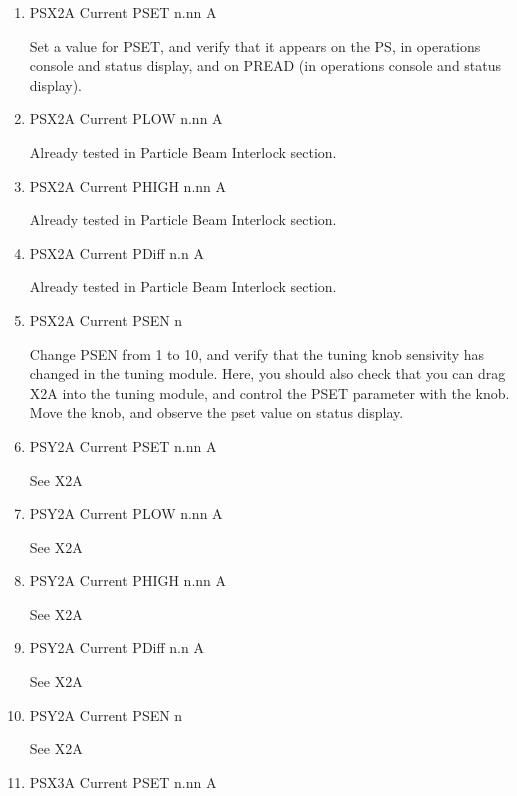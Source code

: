 \documentclass[11pt]{book}		%
\begin{document}
\begin{enumerate}
 \item PSX2A Current PSET  n.nn A

\color{red}
Set a value for PSET, and verify that it appears on the PS, in operations console and status display, and on PREAD (in operations console and status display).
\color{black}

 \item PSX2A Current PLOW  n.nn A

\color{red}
Already tested in Particle Beam Interlock section.
\color{black}

 \item PSX2A Current PHIGH n.nn A

\color{red}
Already tested in Particle Beam Interlock section.
\color{black}


 \item PSX2A Current PDiff n.n A

\color{red}
Already tested in Particle Beam Interlock section.
\color{black}

 \item PSX2A Current PSEN  n

\color{red}
Change PSEN from 1 to 10, and verify that the tuning knob sensivity has changed in the tuning module. Here, you should also check that you can drag X2A into the tuning module, and control the PSET parameter with the knob. Move the knob, and observe the pset value on status display.
\color{black}

 \item PSY2A Current PSET  n.nn A

\color{red}
See X2A
\color{black}

 \item PSY2A Current PLOW  n.nn A

\color{red}
See X2A
\color{black}

 \item PSY2A Current PHIGH n.nn A

\color{red}
See X2A
\color{black}

 \item PSY2A Current PDiff n.n A

\color{red}
See X2A
\color{black}

 \item PSY2A Current PSEN  n

\color{red}
See X2A
\color{black}

 \item PSX3A Current PSET  n.nn A


\end{enumerate}
\end{document}
